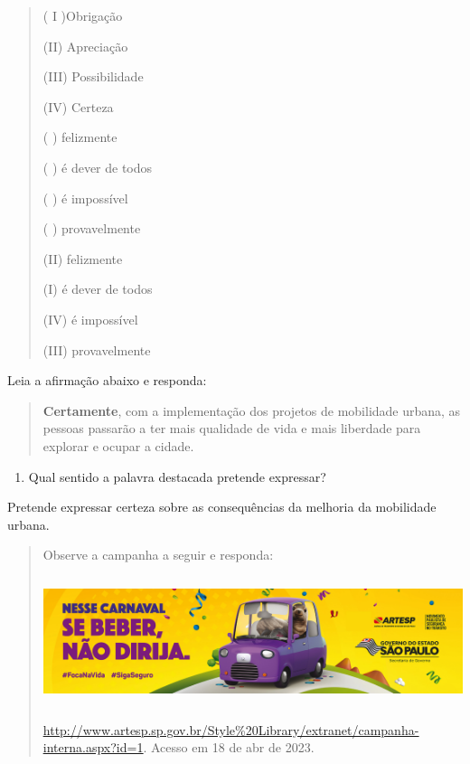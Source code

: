 \begin{quote}
( I )Obrigação

(II) Apreciação

(III) Possibilidade

(IV) Certeza

( ) felizmente

( ) é dever de todos

( ) é impossível

( ) provavelmente

(II) felizmente

(I) é dever de todos

(IV) é impossível

(III) provavelmente
\end{quote}

Leia a afirmação abaixo e responda:

\begin{quote}
\textbf{Certamente}, com a implementação dos projetos de mobilidade
urbana, as pessoas passarão a ter mais qualidade de vida e mais
liberdade para explorar e ocupar a cidade.
\end{quote}

\begin{enumerate}
\def\labelenumi{\arabic{enumi})}
\setcounter{enumi}{4}
\tightlist
\item
  Qual sentido a palavra destacada pretende expressar?
\end{enumerate}

Pretende expressar certeza sobre as consequências da melhoria da
mobilidade urbana.

\begin{quote}
Observe a campanha a seguir e responda:

\includegraphics[width=5.90551in,height=1.47222in]{./imgSAEB_7_POR/media/image10.png}

\href{http://www.artesp.sp.gov.br/Style\%20Library/extranet/campanha-interna.aspx?id=1}{\uline{http://www.artesp.sp.gov.br/Style\%20Library/extranet/campanha-interna.aspx?id=1}}.
Acesso em 18 de abr de 2023.
\end{quote}

